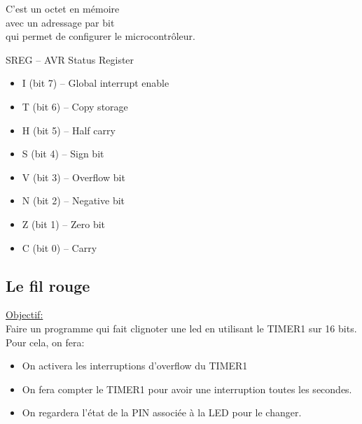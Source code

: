 \documentclass{beamer}
\begin{document}
\begin{frame}
  \begin{block}{}
    C'est un octet en m\'emoire\\
    \pause
    avec un adressage par bit\\
    \pause
    qui permet de configurer le microcontr\^oleur.
    \pause
  \end{block}
  \pause
  \begin{exampleblock}{SREG -- AVR Status Register}
    \begin{itemize}
      \pause
      \item I (bit 7) -- Global interrupt enable
      \pause
      \item T (bit 6) -- Copy storage
      \pause
      \item H (bit 5) -- Half carry
      \pause
      \item S (bit 4) -- Sign bit
      \pause
      \item V (bit 3) -- Overflow bit
      \pause
      \item N (bit 2) -- Negative bit
      \pause
      \item Z (bit 1) -- Zero bit
      \pause
      \item C (bit 0) -- Carry
    \end{itemize}
  \end{exampleblock}
\end{frame}

\subsection{Le fil rouge}

\begin{frame}
  \underline{Objectif:}\\
  Faire un programme qui fait clignoter une led en utilisant le TIMER1 sur 16 bits.\\Pour cela, on fera:\\
  \begin{itemize}
    \pause
    \item On activera les interruptions d'overflow du TIMER1
    \pause
    \item On fera compter le TIMER1 pour avoir une interruption toutes les secondes.
    \pause
    \item On regardera l'\'etat de la PIN associ\'ee \`a la LED pour le changer.
  \end{itemize}
\end{frame}
\end{document}
